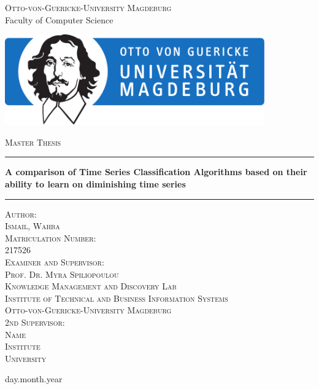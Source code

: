 
\begin{titlepage}

\begin{center}
\textsc{\normalsize {Otto-von-Guericke-University Magdeburg}} \\

Faculty of Computer Science \\
\vspace{1cm}

\includegraphics[width=11.2cm]{Figure/Signet_INF_1}
\vspace{1cm}

\textsc{\huge {Master Thesis}} \\
\vspace{0.95mm}

\rule{\linewidth}{0.3mm}
\large{\bfseries \huge A comparison of Time Series Classification Algorithms based on their
ability to learn on diminishing time series}
\rule[0.3cm]{\linewidth}{0.3mm}

\textsc{\large {Author: \\Ismail, Wahba \\ }}
\vspace{4mm}
\textsc{\large {Matriculation Number: \\ 217526 \\ }}
\vspace{4mm}
\textsc{\large {Examiner and Supervisor: \\
Prof. Dr. Myra Spiliopoulou\\}}
\textsc{\normalsize  {Knowledge Management and Discovery Lab \\
Institute of Technical and Business Information Systems \\
Otto-von-Guericke-University Magdeburg}\\ }
\vspace{4mm}
\textsc{\large { 2nd Supervisor: \\
Name \\ }}
\textsc{\normalsize  {Institute \\
University \\ }}
\vspace{6mm}

day.month.year 



\end{center}

\end{titlepage}